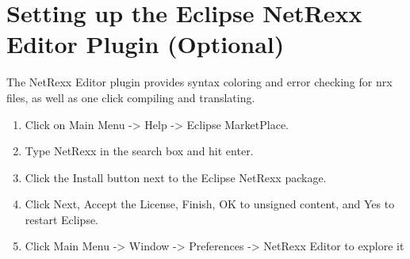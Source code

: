 \section{Setting up the Eclipse NetRexx Editor Plugin (Optional)}
 
The NetRexx Editor plugin provides syntax coloring and error checking
for nrx files, as well as one click compiling and translating.

\begin{enumerate}
\item Click on Main Menu -> Help -> Eclipse MarketPlace.
\item Type NetRexx in the search box and hit enter.
\item Click the Install button next to the Eclipse NetRexx package.
\item Click Next, Accept the License, Finish, OK to unsigned content, and
Yes to restart Eclipse.
\item Click Main Menu -> Window -> Preferences -> NetRexx Editor to explore it
\end{enumerate}